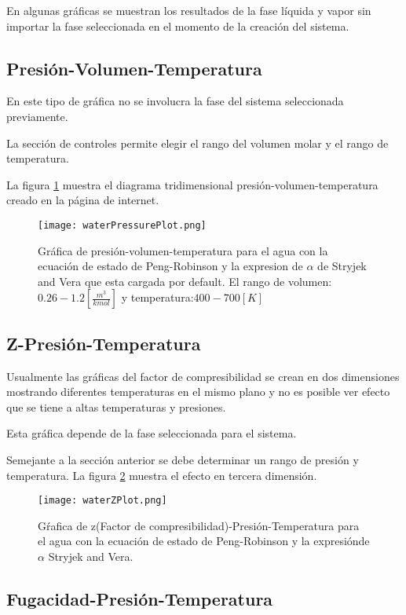 	En algunas gráficas se muestran los resultados de la fase líquida y vapor sin importar la fase seleccionada en el momento de la creación del sistema.

	\subsection{Presión-Volumen-Temperatura}\label{subsec:pvt}
		En este tipo de gráfica no se involucra la fase del sistema seleccionada previamente. 

		La sección de controles permite elegir el rango del volumen molar y el rango de temperatura.
		
		La figura \ref{fig:press} muestra el diagrama tridimensional presión-volumen-temperatura creado en la página de internet.
		\begin{figure}[H]
			\texttt{[image: waterPressurePlot.png]}
			\caption{Gráfica de presión-volumen-temperatura para el agua con la ecuación de estado de Peng-Robinson y la expresion de $\alpha$ de Stryjek and Vera que esta cargada por default. El rango de volumen: $0.26-1.2 [\frac{m^3}{kmol}]$ y temperatura:$400-700[K]$ }
			\label{fig:press}
		\end{figure}
	\subsection{Z-Presión-Temperatura}\label{subsec:zpt}
		Usualmente las gráficas del factor de compresibilidad se crean en dos dimensiones mostrando diferentes temperaturas en el mismo plano y no es posible ver efecto que se tiene a altas temperaturas y presiones.

		Esta gráfica depende de la fase seleccionada para el sistema.

		Semejante a la sección anterior se debe determinar un rango de presión y temperatura. La figura \ref{fig:zplot} muestra el efecto en tercera dimensión.
		\begin{figure}[H]
			\texttt{[image: waterZPlot.png]}
			\caption{Gŕafica de z(Factor de compresibilidad)-Presión-Temperatura para el agua con la ecuación de estado de Peng-Robinson y la expresiónde $\alpha$ Stryjek and Vera.}
			\label{fig:zplot}
		\end{figure}
	\subsection{Fugacidad-Presión-Temperatura}\label{subsec:fpt}

